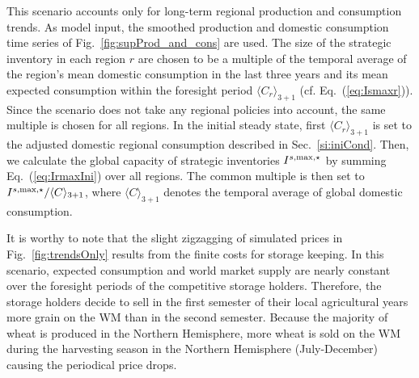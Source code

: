 This scenario accounts only for long-term regional production and consumption trends. As model
input, the smoothed production and domestic consumption time series of
Fig.~\ref{fig:supProd_and_cons} are used. The size of the strategic inventory in each region $r$ are
chosen to be a multiple of the temporal average of the region's mean domestic consumption in the
last three years and its mean expected consumption within the foresight period
$\langle C_r\rangle_{3+1}$ (cf. Eq.~(\ref{eq:Ismaxr})). Since the scenario does not take any
regional policies into account, the same multiple is chosen for all regions.  In the initial steady
state, first $\langle C_r\rangle_{3+1}$ is set to the adjusted domestic regional consumption
described in Sec.~\ref{si:iniCond}. Then, we calculate the global capacity of strategic inventories
$I^{s,\operatorname{max},\star}$ by summing Eq.~(\ref{eq:IrmaxIni}) over all regions. The common multiple is then set to
$I^{s,\operatorname{max},\star}/\langle C\rangle_{3+1}$, where $\langle C\rangle_{3+1}$ denotes the temporal average of
global domestic consumption.

It is worthy to note that the slight zigzagging of simulated prices in
Fig.~\ref{fig:trendsOnly} results from the finite costs for storage keeping. In this scenario,
expected consumption and world market supply are nearly constant over the foresight periods of the
competitive storage holders. Therefore, the storage holders decide to sell in the first semester of
their local agricultural years more grain on the WM than in the second semester. Because the
majority of wheat is produced in the Northern Hemisphere, more wheat is sold on the WM during the
harvesting season in the Northern Hemisphere (July-December) causing the periodical price drops.


